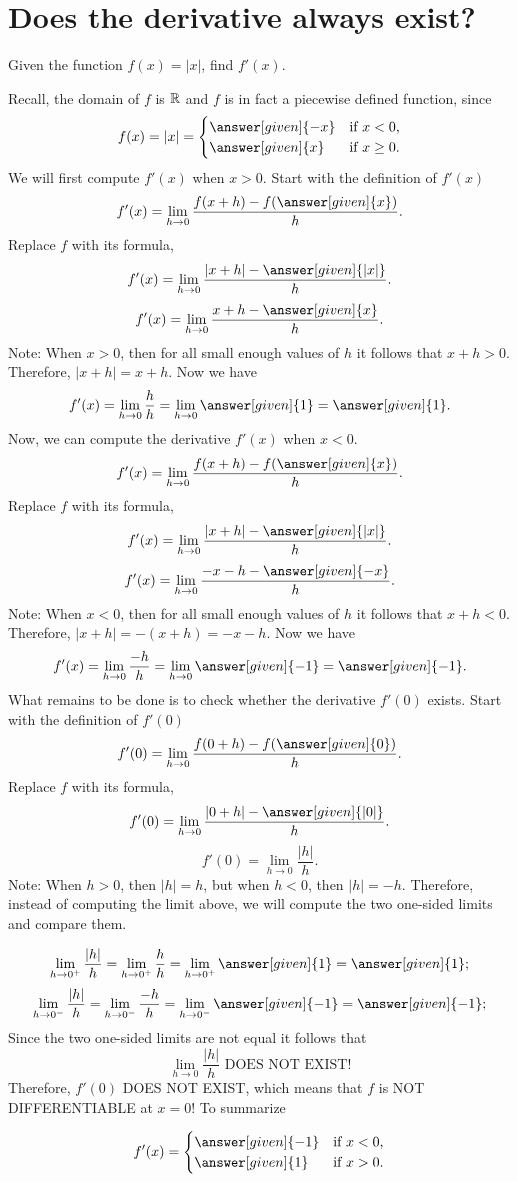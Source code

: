 \documentclass{ximera}
\begin{document}
\section{Does the derivative always exist?}

\begin{example}
	Given the function $f(x) = |x|$, find  $f'(x)$. \\
	
	\begin{explanation}
	Recall, the  domain of $f$ is  $\mathbb R$ and 
  $f$ is in fact a piecewise defined function, since
  \[
f(x) = |x|=
\begin{cases}
  \answer[given]{-x} &\text{if $x<0$,}\\
  \answer[given]{x} &\text{if $x\ge 0$}.
\end{cases}
\]
We will first compute $f'(x)$ when $x>0$.
		Start with the definition of $f'(x)$
		\[
		f'(x) = \lim_{h\to0}\frac{f(x+h)-f(\answer[given]{x})}{h}.
		\]
		Replace $f$ with its formula,
		\[
		f'(x) = \lim_{h\to0}\frac{|x+h|-\answer[given]{|x|}}{h}.
		\]
		\[
		f'(x) = \lim_{h\to0}\frac{x+h-\answer[given]{x}}{h}.
		\]
		Note: When $x>0$, then for all small enough values of  $h$ it follows that $x+h>0$. 
		Therefore, $|x+h|=x+h$.
		Now we have
		\[
		f'(x) = \lim_{h\to0}\frac{h}{h}= \lim_{h\to0}\answer[given]{1}=\answer[given]{1}.
		\]
	Now, we can compute the derivative 	$f'(x)$ when $x<0$.
\[
		f'(x) = \lim_{h\to0}\frac{f(x+h)-f(\answer[given]{x})}{h}.
		\]
		Replace $f$ with its formula,
		\[
		f'(x) = \lim_{h\to0}\frac{|x+h|-\answer[given]{|x|}}{h}.
		\]
		\[
		f'(x) = \lim_{h\to0}\frac{-x-h-\answer[given]{-x}}{h}.
		\]
		Note: When $x<0$, then for all small enough values of  $h$ it follows that $x+h<0$. 
		Therefore, $|x+h|=-(x+h)=-x-h$.
		Now we have
		\[
		f'(x) = \lim_{h\to0}\frac{-h}{h}= \lim_{h\to0}\answer[given]{-1}=\answer[given]{-1}.
		\]
		What remains to be done is to check whether the derivative $f'(0)$ exists.
		Start with the definition of $f'(0)$
		\[
		f'(0) = \lim_{h\to0}\frac{f(0+h)-f(\answer[given]{0})}{h}.
		\]
		Replace $f$ with its formula,
		\[
		f'(0) = \lim_{h\to0}\frac{|0+h|-\answer[given]{|0|}}{h}.
		\]
		\[
		f'(0) = \lim_{h\to0}\frac{|h|}{h}.
		\]
		Note: When $h>0$, then $|h|=h$, but when $h<0$, then $|h|=-h$. 
		Therefore, instead of computing the limit above, we will compute the two one-sided limits and compare them.
		
		\[
		 \lim_{h\to0^+}\frac{|h|}{h}= \lim_{h\to0^+}\frac{h}{h}=\lim_{h\to0^+}\answer[given]{1}=\answer[given]{1};
		\]
		\[
		 \lim_{h\to0^-}\frac{|h|}{h}= \lim_{h\to0^-}\frac{-h}{h}=\lim_{h\to0^-}\answer[given]{-1}=\answer[given]{-1};
		\]
		Since the two one-sided limits are not equal it follows that 
		\[
		 \lim_{h\to0}\frac{|h|}{h} {\text{           DOES NOT EXIST!}}
		\]
		Therefore,   $f'(0)$ DOES NOT EXIST, which means that $f$ is NOT DIFFERENTIABLE at $x=0$!
		To summarize
		
		 \[
f'(x) =
\begin{cases}
  \answer[given]{-1} &\text{if $x<0$,}\\
  \answer[given]{1} &\text{if $x> 0$}.
\end{cases}
\]
	\end{explanation}
\end{example}
\end{document}
